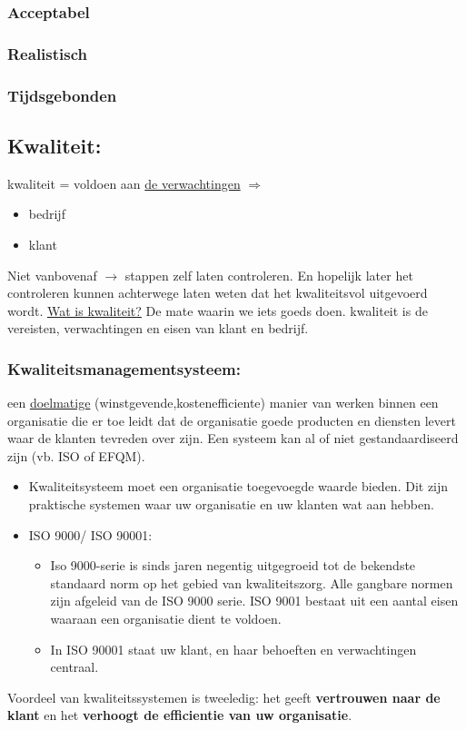 \documentclass[12pt]{article}
\begin{document}
\subsubsection{Acceptabel}
\subsubsection{Realistisch}
\subsubsection{Tijdsgebonden}
\subsection{Kwaliteit:}
kwaliteit = voldoen aan \underline{de verwachtingen} $\Rightarrow$
\begin{itemize}
    \item bedrijf
    \item klant
\end{itemize}
Niet vanbovenaf $\rightarrow$ stappen zelf laten controleren. En hopelijk later het controleren kunnen achterwege laten weten dat het kwaliteitsvol uitgevoerd wordt.
\underline{Wat is kwaliteit?}
De mate waarin we iets goeds doen.
kwaliteit is de vereisten, verwachtingen en eisen van klant en bedrijf.
\subsubsection{Kwaliteitsmanagementsysteem:}
een \underline{doelmatige} (winstgevende,kostenefficiente) manier van werken binnen een organisatie die er toe leidt dat de organisatie goede producten en diensten levert waar de klanten tevreden over zijn. Een systeem kan al of niet gestandaardiseerd zijn (vb. ISO of EFQM).\
\begin{itemize}
    \item[] Kwaliteitsysteem moet een organisatie toegevoegde waarde bieden. Dit zijn praktische systemen waar uw organisatie en uw klanten wat aan hebben.
\end{itemize}
\begin{itemize}
    \item ISO 9000/ ISO 90001:\begin{itemize}
        \item Iso 9000-serie is sinds jaren negentig uitgegroeid tot de bekendste standaard norm op het gebied van kwaliteitszorg. Alle gangbare normen zijn afgeleid van de ISO 9000 serie. ISO 9001 bestaat uit een aantal eisen waaraan een organisatie dient te voldoen. 
        \item In ISO 90001 staat uw klant, en haar behoeften en verwachtingen centraal.
    \end{itemize}
\end{itemize}
Voordeel van kwaliteitssystemen is tweeledig: het geeft \textbf{vertrouwen naar de klant} en het \textbf{verhoogt de efficientie van uw organisatie}.
\end{document}
